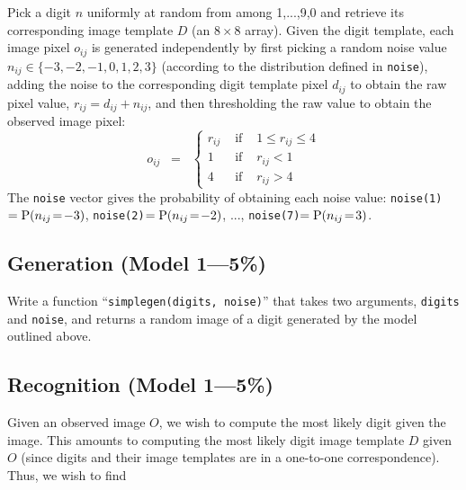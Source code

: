 \documentclass[12pt]{article}
\begin{document}


\noindent
Pick a digit $n$ uniformly at random from among 1,...,9,0
and retrieve its corresponding image template $D$ (an $8\times8$ array).
Given the digit template, each image pixel $o_{ij}$ is generated independently 
by first picking a random noise value $n_{ij}\in\{-3,-2,-1,0,1,2,3\}$
(according to the distribution defined in {\tt noise}),
adding the noise to the corresponding digit template pixel $d_{ij}$
to obtain the raw pixel value, $r_{ij}=d_{ij}+n_{ij}$,
and then thresholding the raw value to obtain the observed image pixel:
\[
o_{ij} \;\;=\;\;\left\{\begin{array}{cll}
r_{ij} & \mbox{ if } & 1\leq r_{ij}\leq4\\
1 & \mbox{ if } & r_{ij} < 1\\
4 & \mbox{ if } & r_{ij} > 4
\end{array}\right.
\]
The {\tt noise} vector gives the probability of obtaining each noise value:
{\tt noise(1)}$={\rm P}(n_{ij}\!=\!-3)$,
{\tt noise(2)}$={\rm P}(n_{ij}\!=\!-2)$,
...,
{\tt noise(7)}$={\rm P}(n_{ij}\!=\!3)$.




\subsection{Generation \rm(Model 1---5\%)}

Write a  function ``{\tt simplegen(digits, noise)}'' that takes two arguments,
{\tt digits} and {\tt noise}, and returns a random image of a 
digit generated by the model outlined above.

\subsection{Recognition \rm(Model 1---5\%)}

Given an observed image $O$, we wish to compute the most likely
digit given the image.  This amounts to computing the most likely
digit image template $D$ given $O$
(since digits and their image templates are in a one-to-one correspondence).
Thus, we wish to find
\end{document}

